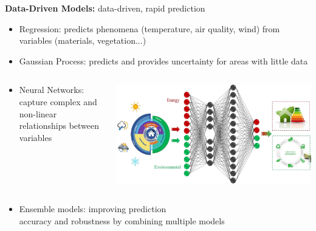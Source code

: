 \documentclass{beamer}
\begin{document}
\begin{frame}
    \small
    \textbf{Data-Driven Models:} data-driven, rapid prediction %
    \begin{itemize}
        \item Regression: predicts phenomena (temperature, air quality, wind) from variables (materials, vegetation...)
        \item Gaussian Process: predicts and provides uncertainty for areas with little data
    \end{itemize}
    \vspace{-0.3cm}
    \begin{columns}[T]
    \begin{column}{0.6\textwidth}
    \begin{itemize}
        \setlength\itemindent{0.3cm}
        \item Neural Networks: capture complex and non-linear relationships between variables 
        \end{itemize}
    \end{column}

    \begin{column}{0.4\textwidth}
        \vspace{-0.3cm}
        \includegraphics[width=1\textwidth]{images/NN-env.jpg}
    \end{column}
    \end{columns}
    \vspace{-0.3cm}
    \begin{itemize}
        \item Ensemble models: improving prediction \\ accuracy and robustness by combining multiple models
    \end{itemize}
\end{frame}
\end{document}
